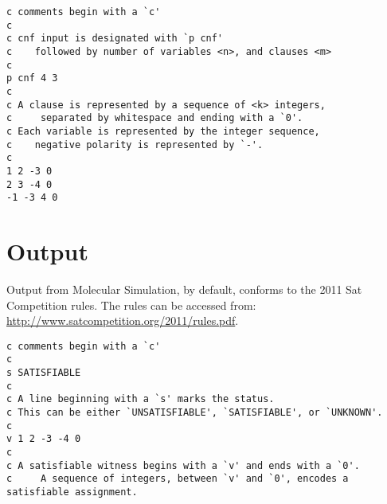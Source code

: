\begin{verbatim}
c comments begin with a `c'
c
c cnf input is designated with `p cnf'
c    followed by number of variables <n>, and clauses <m>
c
p cnf 4 3
c
c A clause is represented by a sequence of <k> integers,
c     separated by whitespace and ending with a `0'.
c Each variable is represented by the integer sequence, 
c    negative polarity is represented by `-'.
c
1 2 -3 0
2 3 -4 0
-1 -3 4 0
\end{verbatim}
		
	\section{Output}
	\label{outputSection}
	

Output from Molecular Simulation, by default, conforms to the 2011 {\sc Sat} Competition rules.  The rules can be accessed from: \url{http://www.satcompetition.org/2011/rules.pdf}.

\begin{verbatim}
c comments begin with a `c'
c
s SATISFIABLE
c
c A line beginning with a `s' marks the status.
c This can be either `UNSATISFIABLE', `SATISFIABLE', or `UNKNOWN'.
c
v 1 2 -3 -4 0
c
c A satisfiable witness begins with a `v' and ends with a `0'.
c     A sequence of integers, between `v' and `0', encodes a satisfiable assignment.
\end{verbatim}

\FloatBarrier

